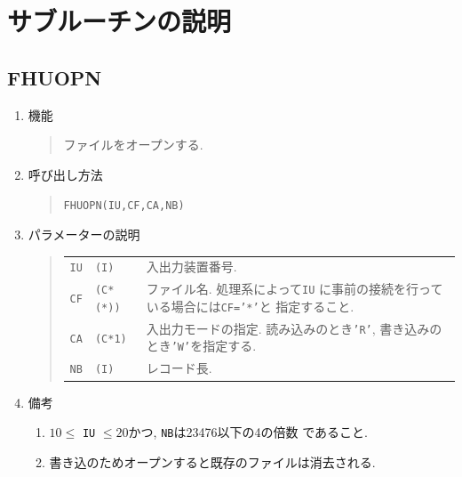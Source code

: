 \section{サブルーチンの説明}

\subsection{FHUOPN}
\begin{enumerate}
  \item 機能 
  \begin{quote}
    ファイルをオープンする. 
  \end{quote}
  \item 呼び出し方法 
  \begin{quote}
    {\tt FHUOPN(IU,CF,CA,NB)}
  \end{quote}
  \item パラメーターの説明 
  \begin{quote}
    \begin{tabular}{llp{10cm}}
      {\tt IU}   & {\tt (I)} & 入出力装置番号. \\
      {\tt CF}   & {\tt (C*(*))} & ファイル名. 処理系によって{\tt IU}
                    に事前の接続を行っている場合には{\tt CF='*'}と
                    指定すること. \\
      {\tt CA}   & {\tt (C*1)} & 入出力モードの指定.
                    読み込みのとき{\tt 'R'}, 
                    書き込みのとき{\tt 'W'}を指定する. \\
      {\tt NB}   & {\tt (I)} & レコード長.
    \end{tabular}
  \end{quote}
  \item 備考 
  \begin{enumerate}
    \item $10\leq$ {\tt IU} $\leq 20$かつ, {\tt NB}は23476以下の4の倍数
    であること.
    \item 書き込のためオープンすると既存のファイルは消去される.
  \end{enumerate}
\end{enumerate}

